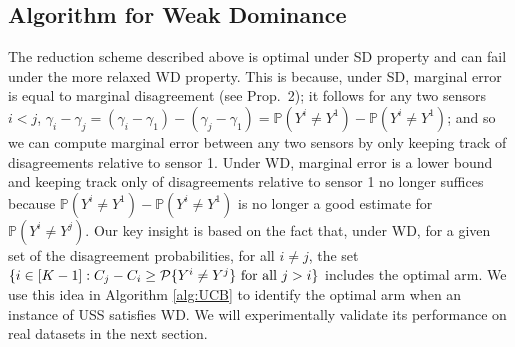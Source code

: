 \documentclass[11pt]{article} %
\newcommand{\todov}[2][]{\todo[color=Purple!20,size=\tiny,#1]{V: #2}}
\newcommand{\Prob}[1]{\mathbb{P}\left(#1\right)}
\begin{document}
\subsection{Algorithm for Weak Dominance}
The reduction scheme described above is optimal under SD property and can fail under the more relaxed WD property. This is because, under SD, marginal error is equal to marginal disagreement (see Prop.~2); it follows for any two sensors $i < j$, $\gamma_i-\gamma_j = (\gamma_i-\gamma_1) - (\gamma_j-\gamma_1) = \Prob{Y^i\ne Y^1} - \Prob{Y^i\ne Y^1}$; and so we can compute marginal error between any two sensors by only keeping track of disagreements relative to sensor 1. Under WD, marginal error is a lower bound and keeping track only of disagreements relative to sensor 1 no longer suffices because $\Prob{Y^i\ne Y^1} - \Prob{Y^i\ne Y^1}$ is no longer a good estimate for $\Prob{Y^i\ne Y^j}$.
%
Our key insight is based on the fact that,
under WD, for a given set of the disagreement probabilities, for all $i \neq j$, the set $\{i \in [K-1]: C_j - C_i \geq \P\{Y^i \neq Y^j\} \mbox{ for all } j>i\}$ includes the optimal arm. We use this idea in Algorithm \ref{alg:UCB} to identify the optimal arm when an instance of USS satisfies WD. We will experimentally validate its performance on real datasets in the next section.
\end{document}
